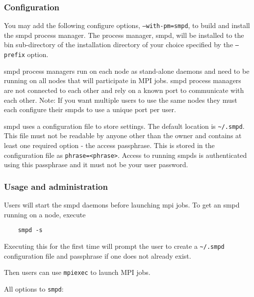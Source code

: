 \documentclass[dvipdfm,11pt]{article}
\begin{document}
\subsubsection{Configuration}
\label{sec:smpd_configure}

You may add the following configure options, 
\texttt{--with-pm=smpd}, 
to build and install the smpd process manager. The process manager, smpd, 
will be installed to the bin sub-directory of the installation directory 
of your choice specified by the \texttt{--prefix} option.

smpd process managers run on each node as stand-alone daemons and need to
be running on all nodes that will participate in MPI jobs.  smpd process 
managers are not connected to each other and rely on a known port to 
communicate with each other.  Note: If you want multiple users to use the 
same nodes they must each configure their smpds to use a unique port per 
user. 

smpd uses a configuration file to store settings.  The default location is 
\verb+~/.smpd+.  This file must not be readable by anyone other than 
the owner and contains at least one required option - the access passphrase.
This is stored in the configuration file as \texttt{phrase=<phrase>}. Access 
to running smpds is authenticated using this passphrase and it must 
not be your user password.

\subsubsection{Usage and administration}
\label{sec:smpd_usage}

Users will start the smpd daemons before launching mpi jobs.  To get an 
smpd running on a node, execute 
\begin{verbatim}
    smpd -s
\end{verbatim}
Executing this for the first time will prompt the user to create a 
\verb+~/.smpd+ configuration file and passphrase if one does not 
already exist.

Then users can use \texttt{mpiexec} to launch MPI jobs.

All options to \texttt{smpd}:
\end{document}
